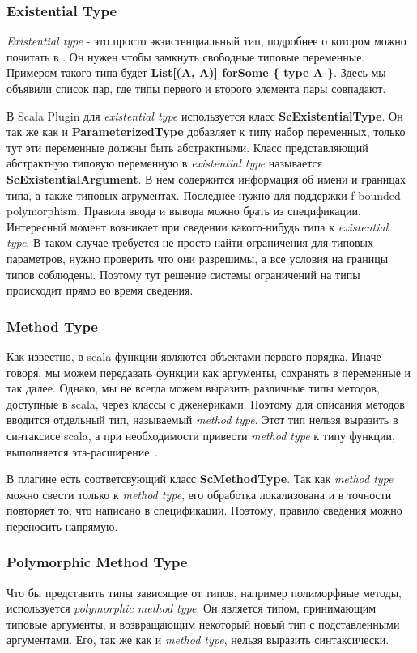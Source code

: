 \subsubsection{Existential Type}
\textit{Existential type} - это просто экзистенциальный тип, подробнее о котором
можно почитать в \cite{type_theory}.
Он нужен чтобы замкнуть свободные типовые переменные.
Примером такого типа будет \textbf{List[(A, A)] forSome \{ type A \}}.
Здесь мы объявили список пар, где типы первого и второго элемента пары совпадают.

В Scala Plugin для \textit{existential type} используется класс
\textbf{ScExistentialType}.
Он так же как и \textbf{ParameterizedType} добавляет к типу набор переменных,
только тут эти переменные должны быть абстрактными.
Класс представляющий абстрактную типовую переменную в \textit{existential type}
называется \textbf{ScExistentialArgument}.
В нем содержится информация об имени и границах типа, а также типовых агрументах.
Последнее нужно для поддержки f-bounded polymorphism.
Правила ввода и вывода можно брать из спецификации.
Интересный момент возникает при сведении какого-нибудь типа к \textit{existential type}.
В таком случае требуется не просто найти ограничения для типовых параметров,
нужно проверить что они разрешимы, а все условия на границы типов соблюдены.
Поэтому тут решение системы ограничений на типы происходит прямо во время сведения.

\subsubsection{Method Type}

Как известно, в scala функции являются объектами первого порядка.
Иначе говоря, мы можем передавать функции как аргументы, сохранять в переменные
и так далее.
Однако, мы не всегда можем выразить различные типы методов, доступные в scala,
через классы с дженериками.
Поэтому для описания методов вводится отдельный тип, называемый \textit{method type}.
Этот тип нельзя выразить в синтаксисе scala, а при необходимости привести
\textit{method type} к типу функции, выполняется эта-расширение~\cite{eta_expansion}.

В плагине есть соответсвующий класс \textbf{ScMethodType}.
Так как \textit{method type} можно свести только к \textit{method type}, его
обработка локализована и в точности повторяет то, что написано в спецификации.
Поэтому, правило сведения можно переносить напрямую.

\subsubsection{Polymorphic Method Type}
Что бы представить типы зависящие от типов, например полиморфные методы,
используется \textit{polymorphic method type}.
Он является типом, принимающим типовые аргументы,
и возвращающим некоторый новый тип с подставленными аргументами.
Его, так же как и \textit{method type}, нельзя выразить синтаксически.

